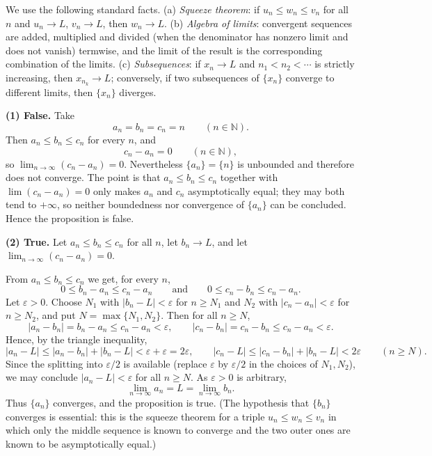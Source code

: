 \documentclass[11pt,a4paper]{article}
\newenvironment{solution}[1]{%
  \par\addvspace{1.7ex}%
  \noindent{\color{solutioncolor}\textbf{#1}}\hspace{0.55em}\ignorespaces}%
  {\par\addvspace{0.9ex}}
\begin{document}
\begin{solution}{Solution 2.1.2}\label{xs:2.1.2}
We use the following standard facts. (a) \emph{Squeeze theorem}: if
$u_n\le w_n\le v_n$ for all $n$ and $u_n\to L$, $v_n\to L$, then $w_n\to L$.
(b) \emph{Algebra of limits}: convergent sequences are added, multiplied and
divided (when the denominator has nonzero limit and does not vanish) termwise,
and the limit of the result is the corresponding combination of the limits.
(c) \emph{Subsequences}: if $x_n\to L$ and $n_1<n_2<\cdots$ is strictly
increasing, then $x_{n_k}\to L$; conversely, if two subsequences of $\{x_n\}$
converge to different limits, then $\{x_n\}$ diverges.

\medskip
\noindent\textbf{(1) False.}
Take
\[
  a_n=b_n=c_n=n\qquad(n\in\mathbb{N}).
\]
Then $a_n\le b_n\le c_n$ for every $n$, and
\[
  c_n-a_n=0\qquad(n\in\mathbb{N}),
\]
so $\lim_{n\to\infty}(c_n-a_n)=0$. Nevertheless $\{a_n\}=\{n\}$ is unbounded and
therefore does not converge. The point is that $a_n\le b_n\le c_n$ together with
$\lim(c_n-a_n)=0$ only makes $a_n$ and $c_n$ asymptotically equal; they may both
tend to $+\infty$, so neither boundedness nor convergence of $\{a_n\}$ can be
concluded. Hence the proposition is false.

\medskip
\noindent\textbf{(2) True.}
Let $a_n\le b_n\le c_n$ for all $n$, let $b_n\to L$, and let
$\lim_{n\to\infty}(c_n-a_n)=0$.

From $a_n\le b_n\le c_n$ we get, for every $n$,
\[
  0\le b_n-a_n\le c_n-a_n
  \qquad\text{and}\qquad
  0\le c_n-b_n\le c_n-a_n .
\]
Let $\varepsilon>0$. Choose $N_1$ with $|b_n-L|<\varepsilon$ for $n\ge N_1$ and
$N_2$ with $|c_n-a_n|<\varepsilon$ for $n\ge N_2$, and put
$N=\max\{N_1,N_2\}$. Then for all $n\ge N$,
\[
  |a_n-b_n|=b_n-a_n\le c_n-a_n<\varepsilon,
  \qquad
  |c_n-b_n|=c_n-b_n\le c_n-a_n<\varepsilon .
\]
Hence, by the triangle inequality,
\[
  |a_n-L|\le|a_n-b_n|+|b_n-L|<\varepsilon+\varepsilon=2\varepsilon,
  \qquad
  |c_n-L|\le|c_n-b_n|+|b_n-L|<2\varepsilon
  \qquad(n\ge N).
\]
Since the splitting into $\varepsilon/2$ is available (replace $\varepsilon$ by
$\varepsilon/2$ in the choices of $N_1,N_2$), we may conclude
$|a_n-L|<\varepsilon$ for all $n\ge N$. As $\varepsilon>0$ is arbitrary,
\[
  \lim_{n\to\infty}a_n=L=\lim_{n\to\infty}b_n .
\]
Thus $\{a_n\}$ converges, and the proposition is true. (The hypothesis that
$\{b_n\}$ converges is essential: this is the squeeze theorem for a triple
$u_n\le w_n\le v_n$ in which only the middle sequence is known to converge and
the two outer ones are known to be asymptotically equal.)


\end{solution}
\end{document}
